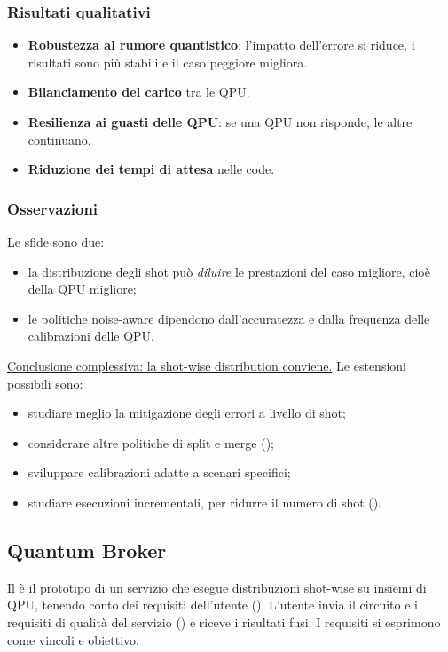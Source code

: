 \subsubsection{Risultati qualitativi}
\begin{itemize}
  \item[$+$] \textbf{Robustezza al rumore quantistico}: l'impatto dell'errore si riduce, i risultati sono più stabili e
    il caso peggiore migliora.
  \item[$+$] \textbf{Bilanciamento del carico} tra le QPU.
  \item[$+$] \textbf{Resilienza ai guasti delle QPU}: se una QPU non risponde, le altre continuano.
  \item[$+$] \textbf{Riduzione dei tempi di attesa} nelle code.
\end{itemize}

\subsubsection{Osservazioni}
Le sfide sono due:
\begin{itemize}
  \item la distribuzione degli shot può \emph{diluire} le prestazioni del caso migliore, cioè della QPU migliore;
  \item le politiche noise-aware dipendono dall'accuratezza e dalla frequenza delle calibrazioni delle QPU.
\end{itemize}
\uline{Conclusione complessiva: la shot-wise distribution conviene.} Le estensioni possibili sono:
\begin{itemize}
  \item studiare meglio la mitigazione degli errori a livello di shot;
  \item considerare altre politiche di split e merge ();
  \item sviluppare calibrazioni adatte a scenari specifici;
  \item studiare esecuzioni incrementali, per ridurre il numero di shot ().
\end{itemize}

\subsection{Quantum Broker}

Il  è il prototipo di un servizio che esegue distribuzioni shot-wise su insiemi di QPU, tenendo
conto dei requisiti dell'utente (). L'utente invia il circuito e i requisiti di qualità del
servizio () e riceve i risultati fusi. I requisiti si esprimono come vincoli e obiettivo.

